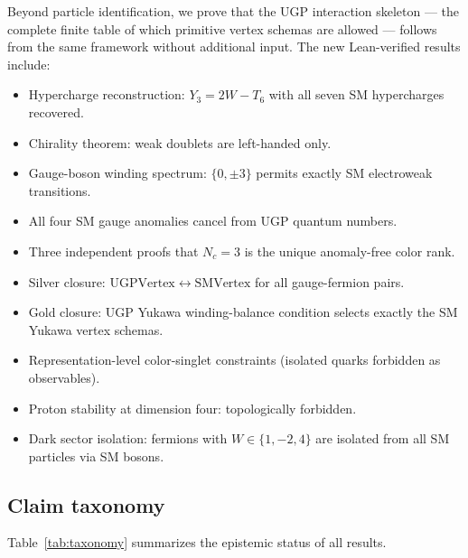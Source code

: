\documentclass[12pt]{article}
\theoremstyle{remark}
\newcommand{\YY}{Y_3}
\newcommand{\TT}{T_6}
\begin{document}
Beyond particle identification, we prove that the UGP interaction skeleton ---
the complete finite table of which primitive vertex schemas are allowed ---
follows from the same framework without additional input.  The new Lean-verified
results include:
\begin{itemize}
  \item Hypercharge reconstruction: $\YY = 2W - \TT$ with all seven SM
    hypercharges recovered.
  \item Chirality theorem: weak doublets are left-handed only.
  \item Gauge-boson winding spectrum: $\{0,\pm 3\}$ permits exactly SM
    electroweak transitions.
  \item All four SM gauge anomalies cancel from UGP quantum numbers.
  \item Three independent proofs that $N_c = 3$ is the unique anomaly-free
    color rank.
  \item Silver closure: $\mathrm{UGPVertex} \leftrightarrow \mathrm{SMVertex}$
    for all gauge-fermion pairs.
  \item Gold closure: UGP Yukawa winding-balance condition selects exactly the
    SM Yukawa vertex schemas.
  \item Representation-level color-singlet constraints (isolated quarks
    forbidden as observables).
  \item Proton stability at dimension four: topologically forbidden.
  \item Dark sector isolation: fermions with $W \in \{1,-2,4\}$ are isolated
    from all SM particles via SM bosons.
\end{itemize}

\subsection{Claim taxonomy}

Table~\ref{tab:taxonomy} summarizes the epistemic status of all results.
\end{document}
